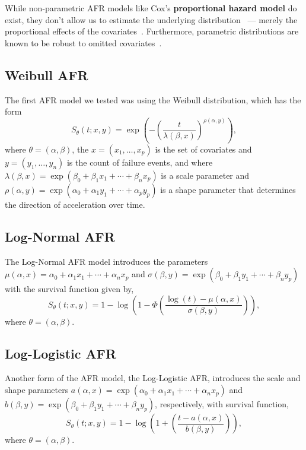 While non-parametric AFR models like Cox's \textbf{proportional hazard model} do exist, they don't allow us to estimate the underlying distribution~\cite{kleinbaum1996survival} --- merely the proportional effects of the covariates~\citep{aft_models}. Furthermore, parametric distributions are known to be robust to omitted covariates~\citep{lambert2004parametric}.

\subsection{Weibull AFR}
The first AFR model we tested was using the Weibull distribution, which has the form
\[
	S_\theta(t; x, y) = \exp{\left( - \left( \frac{t}{\lambda(\beta, x)} \right)^{\rho(\alpha, y)} \right)},
\]
where $\theta=(\alpha, \beta)$, the $x = (x_1, \ldots, x_p)$ is the set of covariates and $y=(y_1, \ldots, y_n)$ is the count of failure events, and where $\lambda(\beta, x)=\exp(\beta_0 + \beta_1 x_1 + \cdots + \beta_n x_p)$ is a scale parameter and $\rho(\alpha, y)=\exp(\alpha_0 + \alpha_1 y_1 + \cdots + \alpha_p y_p)$ is a shape parameter that determines the direction of acceleration over time.

\subsection{Log-Normal AFR}

The Log-Normal AFR model introduces the parameters $\mu(\alpha, x) = \alpha_0 + \alpha_1 x_1 + \cdots + \alpha_n x_p $ and $\sigma(\beta, y) = \exp(\beta_0 + \beta_1 y_1 + \cdots + \beta_n y_p)$ with the survival function given by,
\[
	S_\theta(t; x, y) = 1 - \log \left( 1 - \Phi \left (  \frac{\log(t) - \mu(\alpha, x) }{ \sigma(\beta, y) } \right) \right),
\]
where $\theta = (\alpha, \beta)$.



\subsection{Log-Logistic AFR}

Another form of the AFR model, the Log-Logistic AFR, introduces the scale and shape parameters $a(\alpha, x) = \exp(\alpha_0 + \alpha_1 x_1 + \cdots + \alpha_n x_p )$ and $b(\beta, y) = \exp(\beta_0 + \beta_1 y_1 + \cdots + \beta_n y_p)$, respectively, with survival function,
\[
	S_\theta(t; x, y) = 1 - \log \left( 1 + \left (  \frac{t - a(\alpha, x) }{ b(\beta, y) }\right)\right),
\]
where $\theta = (\alpha, \beta)$.



